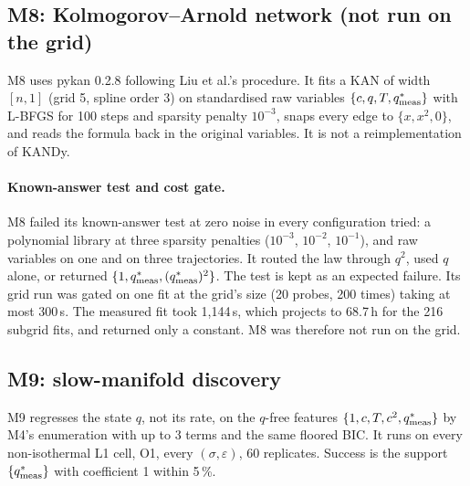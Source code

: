 \subsection*{M8: Kolmogorov--Arnold network (not run on the grid)}
M8 uses pykan 0.2.8 following Liu et al.'s procedure. It fits a KAN of width $[n, 1]$
(grid 5, spline order 3) on standardised raw variables $\{c, q, T, q^{*}_{\mathrm{meas}}\}$ with L-BFGS for
100 steps and sparsity penalty $10^{-3}$, snaps every edge to $\{x, x^2, 0\}$, and reads the
formula back in the original variables. It is not a reimplementation of KANDy.

\paragraph{Known-answer test and cost gate.} M8 failed its known-answer test at zero noise in
every configuration tried: a polynomial library at three sparsity penalties
($10^{-3}$, $10^{-2}$, $10^{-1}$), and raw variables on one and on three trajectories. It routed
the law through $q^2$, used $q$ alone, or returned $\{1, q^{*}_{\mathrm{meas}}, (q^{*}_{\mathrm{meas}})^2\}$. The test is kept as an
expected failure. Its grid run was gated on one fit at the grid's size (20 probes, 200 times)
taking at most 300\,s. The measured fit took 1,144\,s, which projects to 68.7\,h for the 216
subgrid fits, and returned only a constant. M8 was therefore not run on the grid.

\subsection*{M9: slow-manifold discovery}
M9 regresses the state $q$, not its rate, on the $q$-free features $\{1, c, T, c^2, q^{*}_{\mathrm{meas}}\}$ by
M4's enumeration with up to 3 terms and the same floored BIC. It runs on every
non-isothermal L1 cell, O1, every $(\sigma, \varepsilon)$, 60 replicates. Success is the
support $\{q^{*}_{\mathrm{meas}}\}$ with coefficient 1 within 5\,\%.

